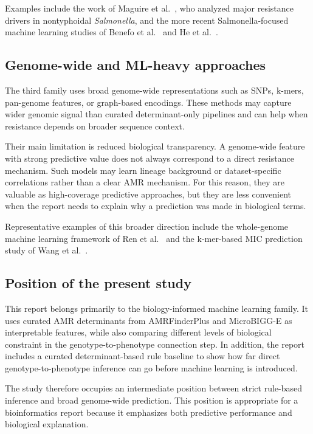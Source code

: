 Examples include the work of Maguire et al.~\citep{maguire2019identification}, who analyzed major resistance drivers in nontyphoidal \textit{Salmonella}, and the more recent Salmonella-focused machine learning studies of Benefo et al.~\citep{benefo2024genomebased} and He et al.~\citep{he2025prediction}.

\subsection{Genome-wide and ML-heavy approaches}

The third family uses broad genome-wide representations such as SNPs, k-mers, pan-genome features, or graph-based encodings. These methods may capture wider genomic signal than curated determinant-only pipelines and can help when resistance depends on broader sequence context.

Their main limitation is reduced biological transparency. A genome-wide feature with strong predictive value does not always correspond to a direct resistance mechanism. Such models may learn lineage background or dataset-specific correlations rather than a clear AMR mechanism. For this reason, they are valuable as high-coverage predictive approaches, but they are less convenient when the report needs to explain why a prediction was made in biological terms.

Representative examples of this broader direction include the whole-genome machine learning framework of Ren et al.~\citep{ren2022prediction} and the k-mer-based MIC prediction study of Wang et al.~\citep{wang2023using}.

\subsection{Position of the present study}

This report belongs primarily to the biology-informed machine learning family. It uses curated AMR determinants from AMRFinderPlus and MicroBIGG-E as interpretable features, while also comparing different levels of biological constraint in the genotype-to-phenotype connection step. In addition, the report includes a curated determinant-based rule baseline to show how far direct genotype-to-phenotype inference can go before machine learning is introduced.

The study therefore occupies an intermediate position between strict rule-based inference and broad genome-wide prediction. This position is appropriate for a bioinformatics report because it emphasizes both predictive performance and biological explanation.
